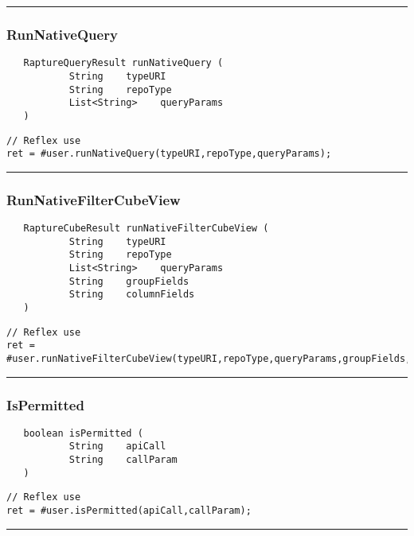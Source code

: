 \rule{15cm}{2pt}
\subsubsection{RunNativeQuery}
\label{Api:RunNativeQuery}
\begin{verbatim}
   RaptureQueryResult runNativeQuery (
           String    typeURI
           String    repoType
           List<String>    queryParams
   )
\end{verbatim}
\begin{lstlisting}[language=reflex]
// Reflex use
ret = #user.runNativeQuery(typeURI,repoType,queryParams);
\end{lstlisting}



\rule{15cm}{2pt}
\subsubsection{RunNativeFilterCubeView}
\label{Api:RunNativeFilterCubeView}
\begin{verbatim}
   RaptureCubeResult runNativeFilterCubeView (
           String    typeURI
           String    repoType
           List<String>    queryParams
           String    groupFields
           String    columnFields
   )
\end{verbatim}
\begin{lstlisting}[language=reflex]
// Reflex use
ret = #user.runNativeFilterCubeView(typeURI,repoType,queryParams,groupFields,columnFields);
\end{lstlisting}



\rule{15cm}{2pt}
\subsubsection{IsPermitted}
\label{Api:IsPermitted}
\begin{verbatim}
   boolean isPermitted (
           String    apiCall
           String    callParam
   )
\end{verbatim}
\begin{lstlisting}[language=reflex]
// Reflex use
ret = #user.isPermitted(apiCall,callParam);
\end{lstlisting}



\rule{15cm}{2pt}
